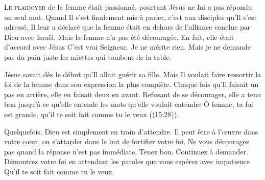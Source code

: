 



\lettrine{L}{e plaidoyer} de la femme était passionné,
 pourtant Jésus ne lui a pas répondu un seul mot.
 Quand Il s'est finalement mis à parler, c'est aux disciples
 qu'Il s'est adressé. Il leur a déclaré que la femme était en dehors
 de l'alliance conclue par Dieu avec Israël.
 Mais la femme n'a pas été découragée.
 En fait, elle était d'accord avec Jésus\frcolon{}
 \Og C'est vrai Seigneur. Je ne mérite rien.
 Mais je ne demande pas du pain
 \ocadr juste les miettes qui tombent de la table. \Fg{}


Jésus savait dès le début qu'Il allait guérir sa fille.
 Mais Il voulait faire ressortir la foi de la femme dans son expression
 la plus complète. Chaque fois qu'Il faisait un pas en arrière,
 elle en faisait deux en avant. Refusant de se décourager,
 elle a tenu bon jusqu'à ce qu'elle entende les mots
 qu'elle voulait entendre\frcolon{} 
 \Og Ô femme, ta foi est grande, qu'il te soit fait comme tu le veux \Fg{}
 ((15:28)). 

Quelquefois, Dieu est simplement en train d'attendre.
 Il peut être à l'\oe{}uvre dans votre c\oe{}ur, ou s'attarder dans le but
 de fortifier votre foi. Ne vous découragez pas quand la réponse
 n'est pas immédiate. Tenez bon. Continuez à demander.
 Démontrez votre foi en attendant
 les paroles que vous espérez
 avec impatience\frcolon{} 
 \Og Qu'il te soit fait comme tu le veux. \Fg{}

\dvrule



